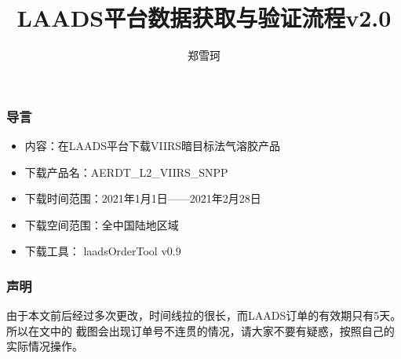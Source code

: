 \documentclass{ctexbeamer}
\title{LAADS平台数据获取与验证流程v2.0}
\author{郑雪珂}
\institute{lengfeng1453@hotmail.com}
\begin{document}
\frame{\titlepage}
\begin{frame}
  \frametitle{导言}
  \begin{itemize}
    \item 内容：在LAADS平台下载VIIRS暗目标法气溶胶产品
    \item 下载产品名：AERDT\_L2\_VIIRS\_SNPP
    \item 下载时间范围：2021年1月1日——2021年2月28日
    \item 下载空间范围：全中国陆地区域
    \item 下载工具： laadsOrderTool v0.9
  \end{itemize}
\end{frame}
\begin{frame}
  \frametitle{声明}
  由于本文前后经过多次更改，时间线拉的很长，而LAADS订单的有效期只有5天。所以在文中的
  截图会出现订单号不连贯的情况，请大家不要有疑惑，按照自己的实际情况操作。

  

\end{frame}


% 

\end{document}
